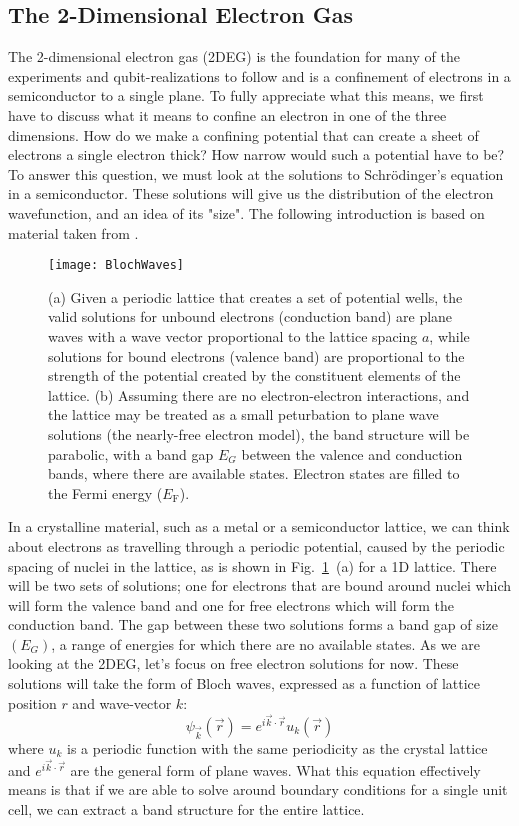 \subsection{The 2-Dimensional Electron Gas}
\label{sec:2deg}
The 2-dimensional electron gas (2DEG) is the foundation for many of the experiments and qubit-realizations to follow and
is a confinement of electrons in a semiconductor to a single plane. To fully
appreciate what this means, we first have to discuss what it means to confine an electron in one of the three dimensions.
How do we make a confining potential that can create a sheet of electrons a single electron thick? How narrow
would such a potential have to be? To answer this question, we must look at the solutions
to Schrödinger's equation in a semiconductor. These solutions will give us the distribution of the electron wavefunction, and
an idea of its "size". The following introduction is based on material taken from \cite{delftbook, ihnbook, Ashcroft}.

\begin{figure}
  \texttt{[image: BlochWaves]}
  \caption[Bloch Waves on a regular lattice]
  {(a) Given a periodic lattice that creates a set of potential wells, the valid solutions for unbound
   electrons (conduction band) are plane waves with a wave vector proportional to the lattice spacing $a$,
   while solutions for bound electrons (valence band) are proportional to the strength of the potential created
   by the constituent elements of the lattice. (b) Assuming there are no electron-electron interactions,
   and the lattice may be treated as a small peturbation to plane wave solutions (the nearly-free electron model),
   the band structure will be parabolic, with a band gap $E_G$ between the valence and conduction bands, where there are
   available states. Electron states are filled to the Fermi energy ($E_\textrm{F}$).}
  \label{fig:blochwaves}
\end{figure}

In a crystalline material, such as a metal or a semiconductor lattice, we can think
about electrons as travelling through a periodic potential, caused by the periodic spacing of nuclei in the lattice, as
is shown in Fig.~\ref{fig:blochwaves}~(a) for a 1D lattice. There will be two sets of solutions; one for electrons
that are bound around nuclei which will form the valence band and one for free electrons which
will form the conduction band. The gap between these two solutions forms a band gap of size $(E_G)$, a range
of energies for which there are no available states. As we are looking at the 2DEG, let's focus on free electron solutions for now.
These solutions will take the form of Bloch waves, expressed as a function of lattice position $r$ and wave-vector $k$:
\begin{equation}
  \psi_{\vec{k}}(\vec{r}) = e^{i\vec{k} \cdot \vec{r}}u_k(\vec{r})
\end{equation}
where $u_k$ is a periodic function with the same periodicity as the crystal lattice and $e^{i\vec{k} \cdot \vec{r}}$ are
the general form of plane waves. What this equation effectively means is that if we are able to solve around boundary conditions for
a single unit cell, we can extract a band structure for the entire lattice.

